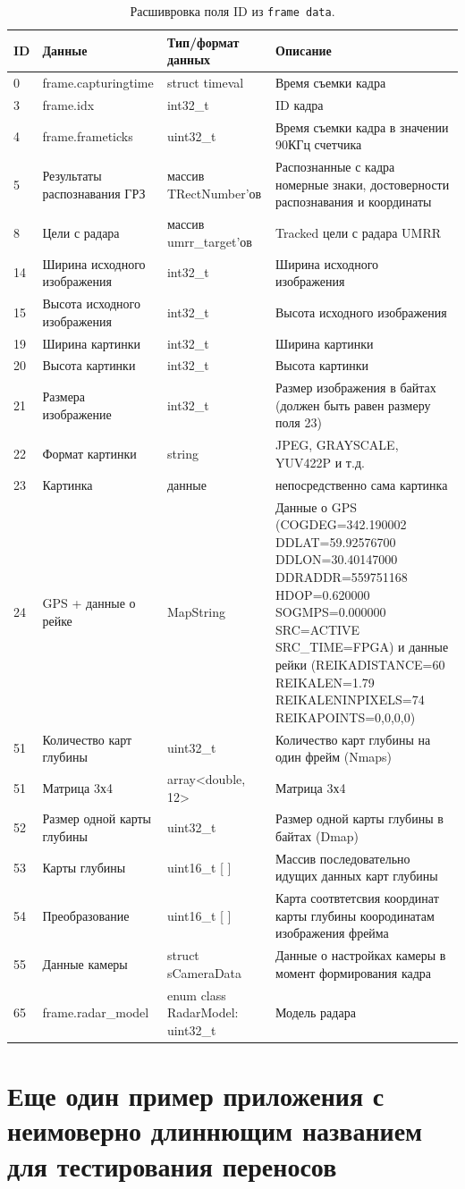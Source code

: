 \documentclass[specification,annotation,times]{itmo-student-thesis}
\begin{document}
\begin{center}
	\begin{longtable}{|p{}|p{}|p{}|p{}|}
		\caption{Расшивровка поля ID из \texttt{frame data}.}\label{tb1:frame-data} \\ \hline
		\textbf{ID}	&\textbf{Данные}&\textbf{Тип/формат данных}&\textbf{Описание}\\\hline\hline
		0	&frame.capturingtime&	struct timeval	&Время съемки кадра\\\hline
		3	&frame.idx	&int32\_t&	ID кадра\\\hline
		4	&frame.frameticks	&uint32\_t&	Время съемки кадра в значении 90КГц счетчика\\\hline
		5	&Результаты распознавания ГРЗ	&массив TRectNumber'ов	&Распознанные с кадра номерные знаки, достоверности распознавания и координаты\\\hline
		8	&Цели с радара&	массив umrr\_target'ов&	Tracked цели с радара UMRR\\\hline
		14	&Ширина исходного изображения&	int32\_t	&Ширина исходного изображения\\\hline
		15	&Высота исходного изображения	&int32\_t&	Высота исходного изображения\\\hline
		19&	Ширина картинки	&int32\_t	&Ширина картинки\\\hline
		20	&Высота картинки	&int32\_t&	Высота картинки\\\hline
		21	&Размера изображение&	int32\_t	&Размер изображения в байтах (должен быть равен размеру поля 23)\\\hline
		22	&Формат картинки&	string	&JPEG, GRAYSCALE, YUV422P и т.д.\\\hline
		23&	Картинка&	данные&	непосредственно сама картинка\\\hline
		24	&GPS + данные о рейке&	MapString	&Данные о GPS (COGDEG=342.190002 DDLAT=59.92576700 DDLON=30.40147000 DDRADDR=559751168 HDOP=0.620000 SOGMPS=0.000000 SRC=ACTIVE SRC\_TIME=FPGA) и данные рейки (REIKADISTANCE=60 REIKALEN=1.79 REIKALENINPIXELS=74 REIKAPOINTS=0,0,0,0)\\\hline
		51&	Количество карт глубины	&uint32\_t	&Количество карт глубины на один фрейм (Nmaps)\\\hline
		51&	Матрица 3х4	&array<double, 12>	&Матрица 3х4\\\hline
		52	&Размер одной карты глубины	&uint32\_t	&Размер одной карты глубины в байтах (Dmap)\\\hline
		53&	Карты глубины	&uint16\_t [ ]&	Массив последовательно идущих данных карт глубины\\\hline
		54	&Преобразование	&uint16\_t [ ]&	Карта соотвтетсвия координат карты глубины коородинатам изображения фрейма\\\hline
		55&	Данные камеры&	struct sCameraData	&Данные о настройках камеры в момент формирования кадра\\\hline
		65&	frame.radar\_model&	enum class RadarModel: uint32\_t	&Модель радара\\\hline
	\end{longtable}
\end{center}


\chapter{Еще один пример приложения с неимоверно длиннющим названием для тестирования переносов}\label{sec:app:2}
\end{document}
